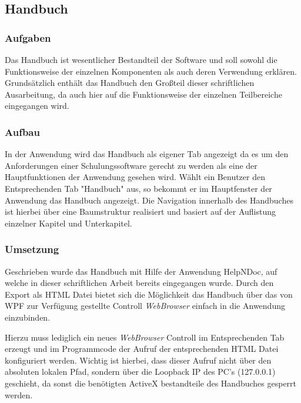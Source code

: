 \subsection{Handbuch}
\subsubsection{Aufgaben}
Das Handbuch ist wesentlicher Bestandteil der Software und soll sowohl die Funktionsweise der einzelnen Komponenten als auch deren Verwendung erklären. Grundsätzlich enthält das Handbuch den Großteil dieser schriftlichen Ausarbeitung, da auch hier auf die Funktionsweise der einzelnen Teilbereiche eingegangen wird. 

\subsubsection{Aufbau}
In der Anwendung wird das Handbuch als eigener Tab angezeigt da es um den Anforderungen einer Schulungssoftware gerecht zu werden als eine der Hauptfunktionen der Anwendung gesehen wird. Wählt ein Benutzer den Entsprechenden Tab "Handbuch" aus, so bekommt er im Hauptfenster der Anwendung das Handbuch angezeigt. 
Die Navigation innerhalb des Handbuches ist hierbei über eine Baumstruktur realisiert und basiert auf der Auflistung einzelner Kapitel und Unterkapitel.

\subsubsection{Umsetzung}
Geschrieben wurde das Handbuch mit Hilfe der Anwendung HelpNDoc, auf welche in dieser schriftlichen Arbeit bereits eingegangen wurde. Durch den Export als HTML Datei bietet sich die Möglichkeit das Handbuch über das von WPF zur Verfügung gestellte Controll \textit{WebBrowser} einfach in die Anwendung einzubinden. 

Hierzu muss lediglich ein neues \textit{WebBrowser} Controll im Entsprechenden Tab erzeugt und im Programmcode der Aufruf der entsprechenden HTML Datei konfiguriert werden.
Wichtig ist hierbei, dass dieser Aufruf nicht über den absoluten lokalen Pfad, sondern über die Loopback IP des PC's (127.0.0.1) geschieht, da sonst die benötigten ActiveX bestandteile des Handbuches gesperrt werden.